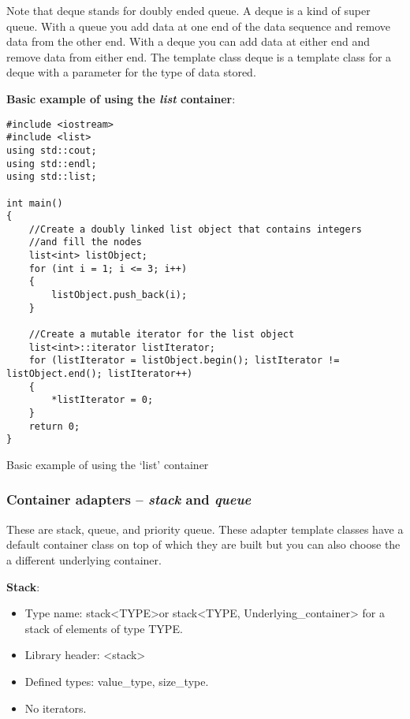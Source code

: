Note that deque stands for doubly ended queue. A deque is a kind of super queue. With a queue you
add data at one end of the data sequence and remove data from the other end. With a deque you can
add data at either end and remove data from either end. The template class deque is a template class
for a deque with a parameter for the type of data stored.


\noindent
\textbf{Basic example of using the \emph{list} container}:
\begin{listing}[H]
\begin{verbatim}
#include <iostream>
#include <list>
using std::cout;
using std::endl;
using std::list;

int main()
{
	//Create a doubly linked list object that contains integers
	//and fill the nodes
	list<int> listObject;
	for (int i = 1; i <= 3; i++)
	{
		listObject.push_back(i);
	}
	
	//Create a mutable iterator for the list object
	list<int>::iterator listIterator;
	for (listIterator = listObject.begin(); listIterator != listObject.end(); listIterator++)
	{
		*listIterator = 0;
	}
	return 0;
}
\end{verbatim}
\caption{Basic example of using the `list' container}
\label{source_code_1}
\end{listing}



\subsubsection{Container adapters -- \emph{stack} and \emph{queue}}
These are stack, queue, and priority queue. These adapter template classes have a default
container class on top of which they are built but you can also choose the a different
underlying container.

\noindent
\textbf{Stack}:
\begin{itemize}
	\item Type name: stack\textless TYPE\textgreater or stack\textless TYPE, Underlying\_container\textgreater
	for a stack of elements of type TYPE.
	\item Library header: \textless stack\textgreater
	\item Defined types: value\_type, size\_type.
	\item No iterators.
\end{itemize}

